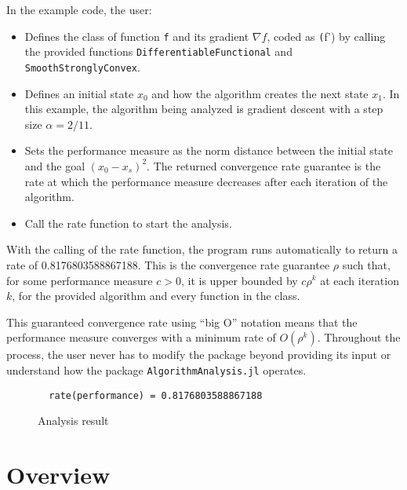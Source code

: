 In the example code, the user:
\begin{itemize}
	\item Defines the class of function \texttt{f} and its gradient $\nabla f$, coded as \texttt(f') by calling the provided functions \texttt{DifferentiableFunctional} and \texttt{SmoothStronglyConvex}.
	\item Defines an initial state $ x_0 $ and how the algorithm creates the next state $ x_1$. In this example, the algorithm being analyzed is gradient descent with a step size $ \alpha = 2/11$.
	\item Sets the performance measure as the norm distance between the initial state and the goal $ (x_0 - x_s)^2 $. The returned convergence rate guarantee is the rate at which the performance measure decreases after each iteration of the algorithm.
	\item Call the rate function to start the analysis.
\end{itemize}

With the calling of the rate function, the program runs automatically to return a rate of 0.8176803588867188. This is the convergence rate guarantee $\rho$ such that, for some performance measure $c>0$, it is upper bounded by $c \rho^k$ at each iteration $k$, for the provided algorithm and every function in the class.

This guaranteed convergence rate using ``big O'' notation means that the performance measure converges with a minimum rate of $O(\rho^k)$. Throughout the process, the user never has to modify the package beyond providing its input or understand how the package \texttt{AlgorithmAnalysis.jl} operates.

\begin{figure}[hbtp]
  \begin{lstlisting}
  rate(performance) = 0.8176803588867188
  \end{lstlisting}
  \caption{Analysis result}
  \label{ex_result}
\end{figure}

\section{Overview} \label{sectionOverview}


